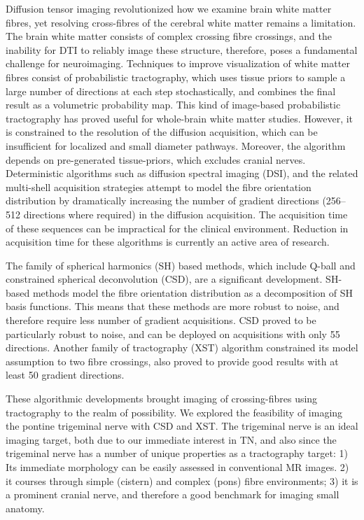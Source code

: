 Diffusion tensor imaging revolutionized how we examine brain white matter fibres, yet resolving cross-fibres of the cerebral white matter remains a limitation. The brain white matter consists of complex crossing fibre crossings, and the inability for DTI to reliably image these structure, therefore, poses a fundamental challenge for neuroimaging.
Techniques to improve visualization of white matter fibres consist of probabilistic tractography, which uses tissue priors to sample a large number of directions at each step stochastically, and combines the final result as a volumetric probability map. This kind of image-based probabilistic tractography has proved useful for whole-brain white matter studies. However, it is constrained to the resolution of the diffusion acquisition, which can be insufficient for localized and small diameter pathways. Moreover, the algorithm depends on pre-generated tissue-priors, which excludes cranial nerves. 
Deterministic algorithms such as diffusion spectral imaging (DSI), and the related multi-shell acquisition strategies attempt to model the fibre orientation distribution by dramatically increasing the number of gradient directions (256--512 directions where required) in the diffusion acquisition. The acquisition time of these sequences can be impractical for the clinical environment. Reduction in acquisition time for these algorithms is currently an active area of research.

The family of spherical harmonics (SH) based methods, which include Q-ball and constrained spherical deconvolution (CSD), are a significant development. SH-based methods model the fibre orientation distribution as a decomposition of SH basis functions. This means that these methods are more robust to noise, and therefore require less number of gradient acquisitions. CSD proved to be particularly robust to noise, and can be deployed on acquisitions with only 55 directions. Another family of tractography (XST) algorithm constrained its model assumption to two fibre crossings, also proved to provide good results with at least 50 gradient directions.

These algorithmic developments brought imaging of crossing-fibres using tractography to the realm of possibility. We explored the feasibility of imaging the pontine trigeminal nerve with CSD and XST. The trigeminal nerve is an ideal imaging target, both due to our immediate interest in TN, and also since the trigeminal nerve has a number of unique properties as a tractography target: 1) Its immediate morphology can be easily assessed in conventional MR images. 2) it courses through simple (cistern) and complex (pons) fibre environments; 3) it is a prominent cranial nerve, and therefore a good benchmark for imaging small anatomy.

